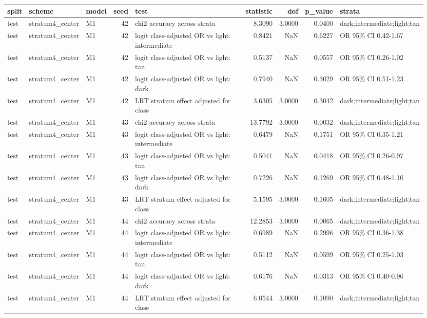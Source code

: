 \begin{tabular}{lllrlrrrl}
\toprule
split & scheme & model & seed & test & statistic & dof & p\_value & strata \\
\midrule
test & stratum4\_center & M1 & 42 & chi2 accuracy across strata & 8.3090 & 3.0000 & 0.0400 & dark;intermediate;light;tan \\
test & stratum4\_center & M1 & 42 & logit class-adjusted OR vs light: intermediate & 0.8421 & NaN & 0.6227 & OR 95\% CI 0.42-1.67 \\
test & stratum4\_center & M1 & 42 & logit class-adjusted OR vs light: tan & 0.5137 & NaN & 0.0557 & OR 95\% CI 0.26-1.02 \\
test & stratum4\_center & M1 & 42 & logit class-adjusted OR vs light: dark & 0.7940 & NaN & 0.3029 & OR 95\% CI 0.51-1.23 \\
test & stratum4\_center & M1 & 42 & LRT stratum effect adjusted for class & 3.6305 & 3.0000 & 0.3042 & dark;intermediate;light;tan \\
test & stratum4\_center & M1 & 43 & chi2 accuracy across strata & 13.7792 & 3.0000 & 0.0032 & dark;intermediate;light;tan \\
test & stratum4\_center & M1 & 43 & logit class-adjusted OR vs light: intermediate & 0.6479 & NaN & 0.1751 & OR 95\% CI 0.35-1.21 \\
test & stratum4\_center & M1 & 43 & logit class-adjusted OR vs light: tan & 0.5041 & NaN & 0.0418 & OR 95\% CI 0.26-0.97 \\
test & stratum4\_center & M1 & 43 & logit class-adjusted OR vs light: dark & 0.7226 & NaN & 0.1269 & OR 95\% CI 0.48-1.10 \\
test & stratum4\_center & M1 & 43 & LRT stratum effect adjusted for class & 5.1595 & 3.0000 & 0.1605 & dark;intermediate;light;tan \\
test & stratum4\_center & M1 & 44 & chi2 accuracy across strata & 12.2853 & 3.0000 & 0.0065 & dark;intermediate;light;tan \\
test & stratum4\_center & M1 & 44 & logit class-adjusted OR vs light: intermediate & 0.6989 & NaN & 0.2996 & OR 95\% CI 0.36-1.38 \\
test & stratum4\_center & M1 & 44 & logit class-adjusted OR vs light: tan & 0.5112 & NaN & 0.0599 & OR 95\% CI 0.25-1.03 \\
test & stratum4\_center & M1 & 44 & logit class-adjusted OR vs light: dark & 0.6176 & NaN & 0.0313 & OR 95\% CI 0.40-0.96 \\
test & stratum4\_center & M1 & 44 & LRT stratum effect adjusted for class & 6.0544 & 3.0000 & 0.1090 & dark;intermediate;light;tan \\

\end{tabular}
